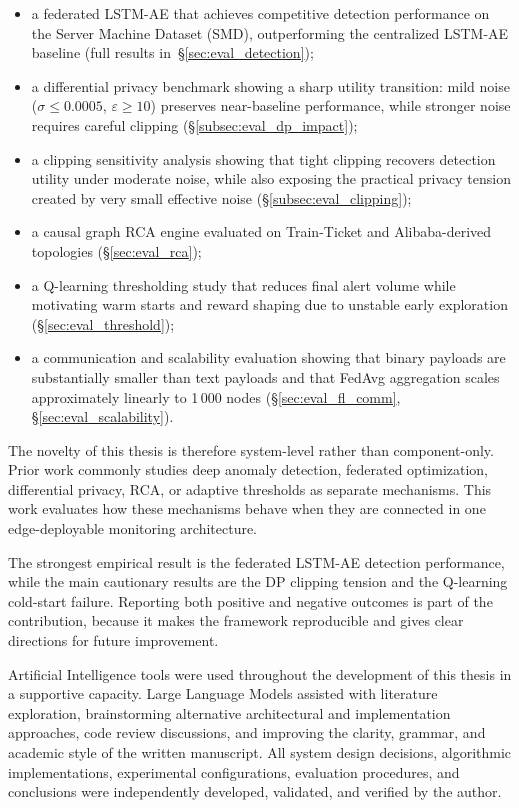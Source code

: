 \begin{itemize}
    \item a federated LSTM-AE that achieves competitive detection performance
    on the Server Machine Dataset (SMD), outperforming the centralized LSTM-AE
    baseline (full results in~\S\ref{sec:eval_detection});
    \item a differential privacy benchmark showing a sharp utility transition:
    mild noise ($\sigma \leq 0.0005$, $\varepsilon \geq 10$) preserves
    near-baseline performance, while stronger noise requires careful clipping
    (\S\ref{subsec:eval_dp_impact});
    \item a clipping sensitivity analysis showing that tight clipping recovers
    detection utility under moderate noise, while also exposing the practical
    privacy tension created by very small effective noise
    (\S\ref{subsec:eval_clipping});
    \item a causal graph RCA engine evaluated on Train-Ticket and
    Alibaba-derived topologies (\S\ref{sec:eval_rca});
    \item a Q-learning thresholding study that reduces final alert volume while
    motivating warm starts and reward shaping due to unstable early exploration
    (\S\ref{sec:eval_threshold});
    \item a communication and scalability evaluation showing that binary
    payloads are substantially smaller than text payloads and that FedAvg
    aggregation scales approximately linearly to 1\,000 nodes
    (\S\ref{sec:eval_fl_comm}, \S\ref{sec:eval_scalability}).
\end{itemize}

The novelty of this thesis is therefore system-level rather than component-only.
Prior work commonly studies deep anomaly detection, federated optimization,
differential privacy, RCA, or adaptive thresholds as separate mechanisms. This
work evaluates how these mechanisms behave when they are connected in one
edge-deployable monitoring architecture.

The strongest empirical result is the federated LSTM-AE detection performance,
while the main cautionary results are the DP clipping tension and the
Q-learning cold-start failure. Reporting both positive and negative outcomes is
part of the contribution, because it makes the framework reproducible and gives
clear directions for future improvement.

Artificial Intelligence tools were used throughout the development of this 
thesis in a supportive capacity. Large Language Models assisted with literature 
exploration, brainstorming alternative architectural and implementation 
approaches, code review discussions, and improving the clarity, grammar, and 
academic style of the written manuscript. All system design decisions, 
algorithmic implementations, experimental configurations, evaluation 
procedures, and conclusions were independently developed, validated, and 
verified by the author.
